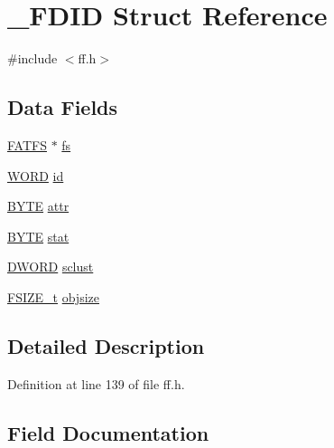 \hypertarget{struct__FDID}{}\section{\+\_\+\+F\+D\+ID Struct Reference}
\label{struct__FDID}


{\ttfamily \#include $<$ff.\+h$>$}

\subsection*{Data Fields}
\begin{DoxyCompactItemize}
\item 
\hyperlink{structFATFS}{F\+A\+T\+FS} $\ast$ \hyperlink{struct__FDID_aefa4597d88e54bace32e6c15e11d9610}{fs}
\item 
\hyperlink{integer_8h_a197942eefa7db30960ae396d68339b97}{W\+O\+RD} \hyperlink{struct__FDID_a363d7bdab408418b911ac1502bc22ea6}{id}
\item 
\hyperlink{integer_8h_a4ae1dab0fb4b072a66584546209e7d58}{B\+Y\+TE} \hyperlink{struct__FDID_a6912cfc1ea914d7b68a18b846065d790}{attr}
\item 
\hyperlink{integer_8h_a4ae1dab0fb4b072a66584546209e7d58}{B\+Y\+TE} \hyperlink{struct__FDID_a1a2ff09f2ef172772f4e7312070be708}{stat}
\item 
\hyperlink{integer_8h_ad342ac907eb044443153a22f964bf0af}{D\+W\+O\+RD} \hyperlink{struct__FDID_ae2fbaaa31b5d12b333cb6d1ded099412}{sclust}
\item 
\hyperlink{ff_8h_a3fc0992ad7436250b6b1a0592214b7f2}{F\+S\+I\+Z\+E\+\_\+t} \hyperlink{struct__FDID_a27039b8d89a4a62efabab36e6b303819}{objsize}
\end{DoxyCompactItemize}


\subsection{Detailed Description}


Definition at line 139 of file ff.\+h.



\subsection{Field Documentation}
\mbox{\label{struct__FDID_a6912cfc1ea914d7b68a18b846065d790}} 

